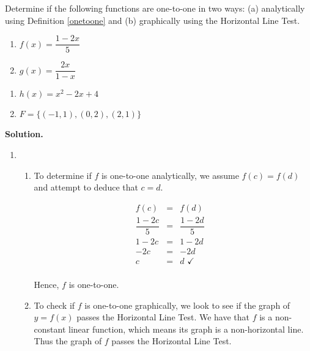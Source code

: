 \begin{ex}  \label{inversefunctiononetooneex} Determine if the following functions are one-to-one in two ways: (a) analytically using Definition \ref{onetoone} and (b) graphically using the Horizontal Line Test.

\begin{multicols}{2}
\begin{enumerate}

\item  $f(x) = \dfrac{1-2x}{5}$

\item  $g(x) = \dfrac{2x}{1-x}$

\setcounter{HW}{\value{enumi}}
\end{enumerate}
\end{multicols}

\begin{multicols}{2}
\begin{enumerate}
\setcounter{enumi}{\value{HW}}

\item  $h(x) = x^2 - 2x+4$

\item  $F = \{(-1,1), (0,2), (2,1)\}$

\end{enumerate}
\end{multicols}

{\bf Solution.}  

\begin{enumerate}

\item  \begin{enumerate} \item To determine if $f$ is one-to-one analytically, we assume $f(c) = f(d)$ and attempt to deduce that $c=d$. 

\[ \begin{array}{rclr}

f(c) & = & f(d) & \\ [3pt]
\dfrac{1-2c}{5} & = & \dfrac{1-2d}{5} & \\ [5pt]
1-2c & = & 1-2d & \\
-2c & = & -2d & \\
c & = & d \, \, \checkmark & \\

\end{array} \]

Hence, $f$ is one-to-one.

\item  To check if $f$ is one-to-one graphically, we look to see if the graph of $y=f(x)$ passes the Horizontal Line Test.  We have that $f$ is a non-constant linear function, which means its graph is a non-horizontal line.  Thus the  graph of $f$ passes the Horizontal Line Test.



\end{enumerate}
\end{enumerate}
\end{ex}
